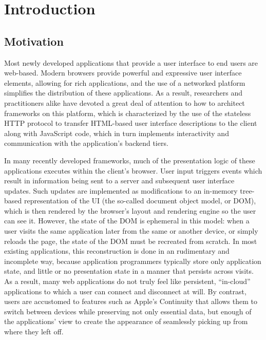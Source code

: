\chapter{Introduction}

\section{Motivation}

Most newly developed applications that provide a user interface to end users 
are web-based.  Modern browsers provide powerful and expressive user interface 
elements, allowing for rich applications, and the use of a networked
platform simplifies the distribution of these applications.  As a result,
researchers and practitioners alike have devoted a great deal of attention to
how to architect frameworks on this platform, which is characterized by the
use of the stateless HTTP protocol to transfer HTML-based user interface 
descriptions to the client along with JavaScript code, which in turn 
implements interactivity and communication with the application's backend tiers.

In many recently developed frameworks, much of the presentation logic of these applications
executes within the client's browser.  User input triggers events
which result in information being sent to a server and subsequent user interface updates.
Such updates are implemented as modifications to an in-memory tree-based
representation of the UI (the so-called document object model, or DOM), which
is then rendered by the browser's layout and rendering engine so the user can see it.
However, the state of the DOM is ephemeral in this model: when a user visits 
the same application later from the same or another device, or simply reloads the page, the state of the
DOM must be recreated from scratch.  In most existing applications, this 
reconstruction is done in an rudimentary and incomplete way, because
application programmers typically store only application state, and little 
or no presentation state in a manner that persists across visits.
As a result, many web applications do not truly feel like persistent,
``in-cloud'' applications to which a user can connect and disconnect at will.
By contrast, users are accustomed to features such as Apple's Continuity\cite{apple-continuity}
that allows them to switch between devices while preserving not only 
essential data, but enough of the applications' view to create the appearance
of seamlessly picking up from where they left off.

